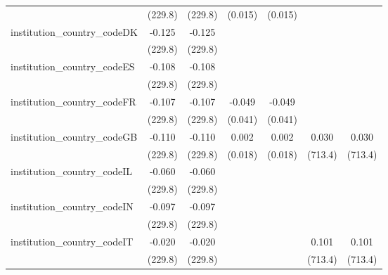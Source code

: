 \begin{tabular}{lcccccc}
                                         & (229.8)        & (229.8)        & (0.015)        & (0.015)        &               &   \\   
   institution\_country\_codeDK          & -0.125         & -0.125         &                &                &               &   \\   
                                         & (229.8)        & (229.8)        &                &                &               &   \\   
   institution\_country\_codeES          & -0.108         & -0.108         &                &                &               &   \\   
                                         & (229.8)        & (229.8)        &                &                &               &   \\   
   institution\_country\_codeFR          & -0.107         & -0.107         & -0.049         & -0.049         &               &   \\   
                                         & (229.8)        & (229.8)        & (0.041)        & (0.041)        &               &   \\   
   institution\_country\_codeGB          & -0.110         & -0.110         & 0.002          & 0.002          & 0.030         & 0.030\\   
                                         & (229.8)        & (229.8)        & (0.018)        & (0.018)        & (713.4)       & (713.4)\\   
   institution\_country\_codeIL          & -0.060         & -0.060         &                &                &               &   \\   
                                         & (229.8)        & (229.8)        &                &                &               &   \\   
   institution\_country\_codeIN          & -0.097         & -0.097         &                &                &               &   \\   
                                         & (229.8)        & (229.8)        &                &                &               &   \\   
   institution\_country\_codeIT          & -0.020         & -0.020         &                &                & 0.101         & 0.101\\   
                                         & (229.8)        & (229.8)        &                &                & (713.4)       & (713.4)\\   

\end{tabular}
